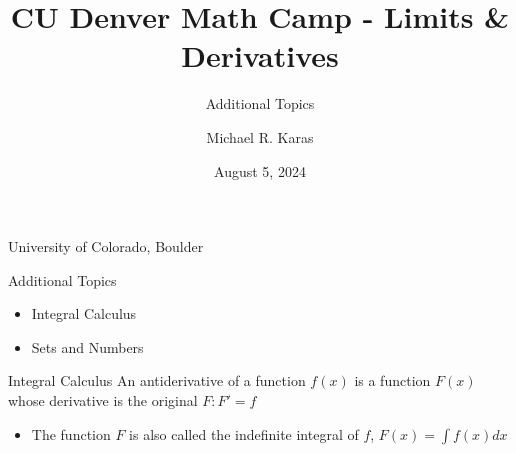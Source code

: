 \documentclass[aspectratio=169]{beamer}
\title{CU Denver Math Camp - Limits \& Derivatives}
\subtitle{Additional Topics}
\date{August 5, 2024}
\author{Michael R. Karas}
\begin{document}
\begin{frame}
\maketitle

{\footnotesize University of Colorado, Boulder}
\end{frame}

\begin{frame}{Additional Topics}\label{main1}

\begin{itemize}
	\begin{itemize}
		\item Integral Calculus	
		\item Sets and Numbers
	\end{itemize}
\end{itemize}
\end{frame}

\begin{frame}{Integral Calculus}\label{main1}
	An antiderivative of a function $f(x)$ is a function $F(x)$ whose derivative is the original $F:F' = f$
\begin{itemize}
	\begin{itemize}
		\item The function $F$ is also called the indefinite integral of $f$, $F(x) = \int f(x) dx$
	\end{itemize}
\end{itemize}
\end{frame}
\end{document}
